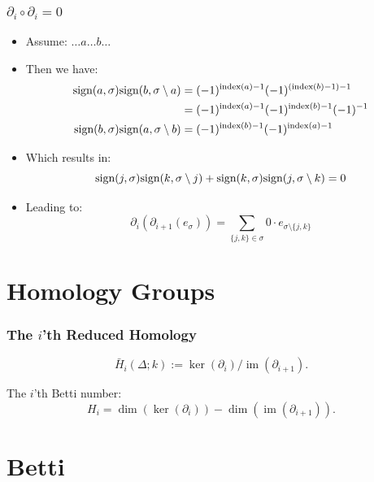\documentclass{beamer}
\DeclareMathOperator{\im}{im}
\begin{document}
\begin{frame}
\frametitle{$\partial_{i}\circ \partial_{i}=0$}
\begin{itemize}
\item Assume: $\dots a \dots b \dots$
\item Then we have:
\begin{align*}
\textnormal{sign}(a,\sigma)\textnormal{sign}(b,\sigma\setminus a) &= (-1)^{\textnormal{index}(a)-1}(-1)^{(\textnormal{index}(b)-1)-1}\\
&= (-1)^{\textnormal{index}(a)-1}(-1)^{\textnormal{index}(b)-1}(-1)^{-1}\\
\textnormal{sign}(b,\sigma)\textnormal{sign}(a,\sigma\setminus b) &= (-1)^{\textnormal{index}(b)-1}(-1)^{\textnormal{index}(a)-1}\\
\end{align*} \pause
\item Which results in:
\begin{equation*}
\textnormal{sign}(j,\sigma)\textnormal{sign}(k,\sigma\setminus j) + \textnormal{sign}(k,\sigma)\textnormal{sign}(j,\sigma\setminus k) = 0
\end{equation*}\pause
\item Leading to:
\begin{equation*}
\partial_i(\partial_{i+1}(e_\sigma))=\sum_{\{j,k\}\in\sigma}0\cdot e_{\sigma\setminus\{j,k\}}
\end{equation*}
\end{itemize}
\end{frame}

\section{Homology Groups}
\begin{frame}
\frametitle{The $i$'th Reduced Homology}
\begin{equation*}
\bar{H}_i(\Delta;k):=\ker(\partial_i)/\im(\partial_{i+1}).
\end{equation*}

The $i$'th Betti number:
\begin{equation*}
H_i = \dim(\ker(\partial_i))-\dim(\im(\partial_{i+1})).
\end{equation*}
\end{frame}

\section{Betti}
\end{document}

